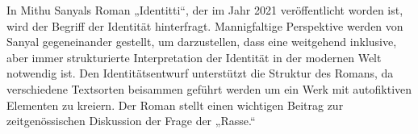 In Mithu Sanyals Roman „Identitti“, der im Jahr 2021 veröffentlicht worden ist, wird der Begriff
der Identität hinterfragt. Mannigfaltige Perspektive werden von Sanyal gegeneinander gestellt,
um darzustellen, dass eine weitgehend inklusive, aber immer strukturierte Interpretation der
Identität in der modernen Welt notwendig ist. Den Identitätsentwurf unterstützt die Struktur des
Romans, da verschiedene Textsorten beisammen geführt werden um ein Werk mit autofiktiven
Elementen zu kreiern. Der Roman stellt einen wichtigen Beitrag zur zeitgenössischen Diskussion
der Frage der „Rasse.“
